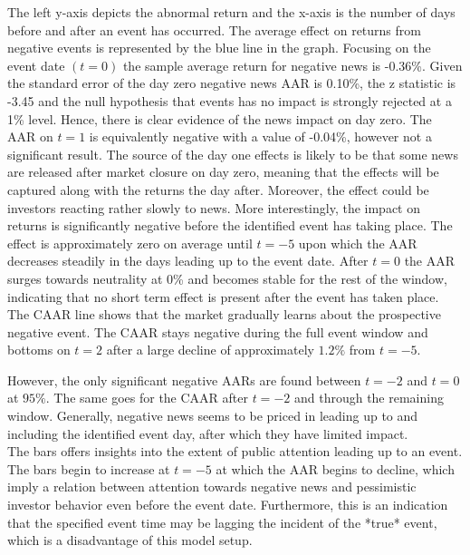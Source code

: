 The left y-axis depicts the abnormal return and the x-axis is the number of days before and after an event has occurred. The average effect on returns from negative events is represented by the blue line in the graph. 
Focusing on the event date $(t=0)$ the sample average return for negative news is -0.36\%. Given the standard error of the day zero negative news AAR is  0.10\%, the z statistic is -3.45 and the null hypothesis that events has no impact is strongly rejected at a 1\% level. Hence, there is clear evidence of the news impact on day zero. The AAR on $t=1$ is equivalently negative with a value of -0.04\%, however not a significant result. The source of the day one effects is likely to be that some news are released after market closure on day zero, meaning that the effects will be captured along with the returns the day after. Moreover, the effect could be investors reacting rather slowly to news. 
More interestingly, the impact on returns is significantly negative before the identified event has taking place. 
The effect is approximately zero on average until $t = -5$ upon which the AAR decreases steadily in the days leading up to the event date. After $t=0$ the AAR surges towards neutrality at 0\% and becomes stable for the rest of the window, indicating that no short term effect is present after the event has taken place. The CAAR line shows that the market gradually learns about the prospective negative event. 
The CAAR stays negative during the full event window and bottoms on $t=2$ after a large decline of approximately $1.2\%$ from $t=-5$. 

However, the only significant negative AARs are found between $t=-2$ and $t=0$ at $95\%$. The same goes for the CAAR after $t=-2$ and through the remaining window. Generally, negative news seems to be priced in leading up to and including the identified event day, after which they have limited impact. \\ 
The bars offers insights into the extent of public attention leading up to an event. The bars begin to increase at $t=-5$ at which the AAR begins to decline, which imply a relation between attention towards negative news and pessimistic investor behavior even before the event date. Furthermore, this is an indication that the specified event time may be lagging the incident of the *true* event, which is a disadvantage of this model setup.  

